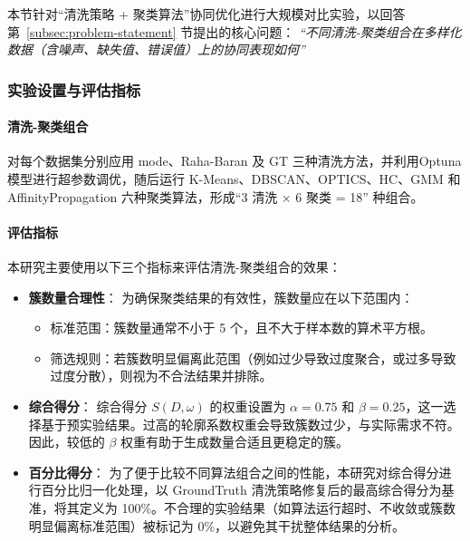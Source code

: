 \documentclass[10pt]{article} %
\numberwithin{equation}{section}
\begin{document}
本节针对“清洗策略 + 聚类算法”协同优化进行大规模对比实验，以回答第~\ref{subsec:problem-statement} 节提出的核心问题：
\emph{“不同清洗-聚类组合在多样化数据（含噪声、缺失值、错误值）上的协同表现如何”}

\subsubsection{实验设置与评估指标}
\label{sec:exp_setting_largeset}

\paragraph{清洗-聚类组合}
对每个数据集分别应用 mode、Raha-Baran 及 GT 三种清洗方法，并利用Optuna模型\cite{10.1145/3292500.3330701}进行超参数调优，随后运行 K-Means、DBSCAN、OPTICS、HC、GMM 和 AffinityPropagation 六种聚类算法，形成“3 清洗 × 6 聚类 = 18” 种组合。

\paragraph{评估指标}
本研究主要使用以下三个指标来评估清洗-聚类组合的效果：

\begin{itemize}
    \item \textbf{簇数量合理性}：  
    为确保聚类结果的有效性，簇数量应在以下范围内：  
    \begin{itemize}
        \item 标准范围：簇数量通常不小于 5 个，且不大于样本数的算术平方根。
        \item 筛选规则：若簇数明显偏离此范围（例如过少导致过度聚合，或过多导致过度分散），则视为不合法结果并排除。
    \end{itemize}
    
    \item \textbf{综合得分}：  
    综合得分 \(S(D,\omega)\) 的权重设置为 \(\alpha = 0.75\) 和 \(\beta = 0.25\)，这一选择基于预实验结果。过高的轮廓系数权重会导致簇数过少，与实际需求不符。因此，较低的 \(\beta\) 权重有助于生成数量合适且更稳定的簇。

    \item \textbf{百分比得分}：  
    为了便于比较不同算法组合之间的性能，本研究对综合得分进行百分比归一化处理，以 GroundTruth 清洗策略修复后的最高综合得分为基准，将其定义为 100\%。不合理的实验结果（如算法运行超时、不收敛或簇数明显偏离标准范围）被标记为 0\%，以避免其干扰整体结果的分析。

\end{itemize}
\end{document}
